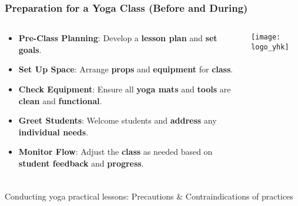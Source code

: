 \begin{frame}[fragile]\frametitle{Preparation for a Yoga Class (Before and During)}
\begin{columns}
    \begin{column}[T]{0.5\linewidth}
      \begin{itemize}
        \item \textbf{Pre-Class Planning}: Develop a \textbf{lesson plan} and \textbf{set goals}.
        \item \textbf{Set Up Space}: Arrange \textbf{props} and \textbf{equipment} for \textbf{class}.
        \item \textbf{Check Equipment}: Ensure all \textbf{yoga mats} and \textbf{tools} are \textbf{clean} and \textbf{functional}.
        \item \textbf{Greet Students}: Welcome students and \textbf{address} any \textbf{individual needs}.
        \item \textbf{Monitor Flow}: Adjust the \textbf{class} as needed based on \textbf{student feedback} and \textbf{progress}.
      \end{itemize}
    \end{column}
    \begin{column}[T]{0.5\linewidth}
        \begin{center}
        \texttt{[image: logo\_yhk]}
        \end{center}	
    \end{column}
\end{columns}
\end{frame}


\begin{frame}[fragile]\frametitle{}
\begin{center}
{\Large Conducting yoga practical lessons: Precautions \& Contraindications of practices}
\end{center}
\end{frame}

